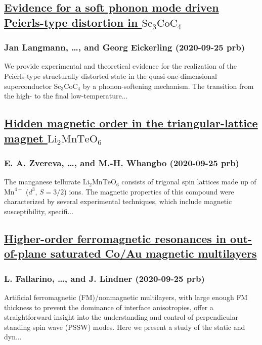 \subsection*{\href{http://link.aps.org/doi/10.1103/PhysRevB.102.094109}{Evidence for a soft phonon mode driven Peierls-type distortion in ${\mathrm{Sc}}_{3}\mathrm{Co}{\mathrm{C}}_{4}$}}
\subsubsection*{Jan Langmann, \dots, and Georg Eickerling (2020-09-25 prb)}
We provide experimental and theoretical evidence for the realization of the Peierls-type structurally distorted state in the quasi-one-dimensional superconductor ${\mathrm{Sc}}_{3}\mathrm{Co}{\mathrm{C}}_{4}$ by a phonon-softening mechanism. The transition from the high- to the final low-temperature...
\subsection*{\href{http://link.aps.org/doi/10.1103/PhysRevB.102.094433}{Hidden magnetic order in the triangular-lattice magnet ${\mathrm{Li}}_{2}{\mathrm{MnTeO}}_{6}$}}
\subsubsection*{E. A. Zvereva, \dots, and M.-H. Whangbo (2020-09-25 prb)}
The manganese tellurate ${\mathrm{Li}}_{2}{\mathrm{MnTeO}}_{6}$ consists of trigonal spin lattices made up of ${\mathrm{Mn}}^{4+}$ (${d}^{3}$, $S=3/2$) ions. The magnetic properties of this compound were characterized by several experimental techniques, which include magnetic susceptibility, specifi...
\subsection*{\href{http://link.aps.org/doi/10.1103/PhysRevB.102.094434}{Higher-order ferromagnetic resonances in out-of-plane saturated Co/Au magnetic multilayers}}
\subsubsection*{L. Fallarino, \dots, and J. Lindner (2020-09-25 prb)}
Artificial ferromagnetic (FM)/nonmagnetic multilayers, with large enough FM thickness to prevent the dominance of interface anisotropies, offer a straightforward insight into the understanding and control of perpendicular standing spin wave (PSSW) modes. Here we present a study of the static and dyn...
